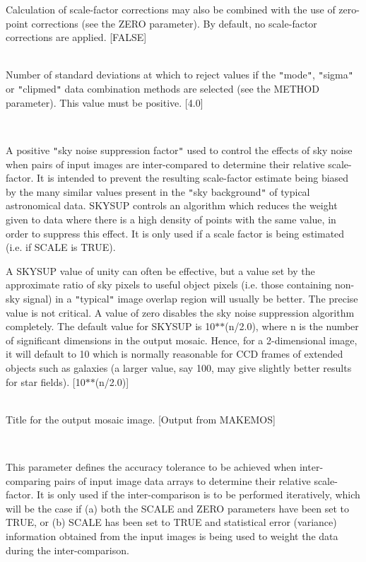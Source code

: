 \documentclass[twoside,11pt]{article}
\renewcommand{\_}{\texttt{\symbol{95}}}
\newcommand{\qt}[1]{{\tt "}#1{\tt "}}
\newcommand{\sstsubsection}[1]{ \item[{#1}] \mbox{} \\}
\newcommand{\sstsubsection}[1]{\item[{#1}]}
\begin{document}
{{{         Calculation of scale-factor corrections may also be combined
         with the use of zero-point corrections (see the ZERO
         parameter). By default, no scale-factor corrections are
         applied.
         [FALSE]
      }
      \sstsubsection{
         SIGMAS = \_REAL (Read)
      } {
         Number of standard deviations at which to reject values if the
         \qt{mode}, \qt{sigma} or \qt{clipmed} data combination
         methods are selected (see the METHOD parameter). This value
         must be positive. [4.0]
      }
      \sstsubsection{
         SKYSUP = \_REAL (Read)
      } {
         A positive \qt{sky noise suppression factor} used to control the
         effects of sky noise when pairs of input images are
         inter-compared to determine their relative scale-factor. It is
         intended to prevent the resulting scale-factor estimate being
         biased by the many similar values present in the \qt{sky background}
         of typical astronomical data.  SKYSUP controls an
         algorithm which reduces the weight given to data where there
         is a high density of points with the same value, in order to
         suppress this effect. It is only used if a scale factor is
         being estimated (i.e. if SCALE is TRUE).

         A SKYSUP value of unity can often be effective, but a value
         set by the approximate ratio of sky pixels to useful object
         pixels (i.e. those containing non-sky signal) in a \qt{typical}
         image overlap region will usually be better. The precise value
         is not critical. A value of zero disables the sky noise
         suppression algorithm completely. The default value for SKYSUP
         is 10$*$$*$(n/2.0), where n is the number of significant
         dimensions in the output mosaic. Hence, for a 2-dimensional
         image, it will default to 10 which is normally reasonable for
         CCD frames of extended objects such as galaxies (a larger
         value, say 100, may give slightly better results for star
         fields).
         [10$*$$*$(n/2.0)]
      }
      \sstsubsection{
         TITLE = LITERAL (Read)
      } {
         Title for the output mosaic image. [Output from MAKEMOS]
      }
      \sstsubsection{
         TOLS = \_REAL (Read)
      } {
         This parameter defines the accuracy tolerance to be achieved
         when inter-comparing pairs of input image data arrays to
         determine their relative scale-factor. It is only used if the
         inter-comparison is to be performed iteratively, which will be
         the case if (a) both the SCALE and ZERO parameters have been
         set to TRUE, or (b) SCALE has been set to TRUE and statistical
         error (variance) information obtained from the input images is
         being used to weight the data during the inter-comparison.

}}}
\end{document}

